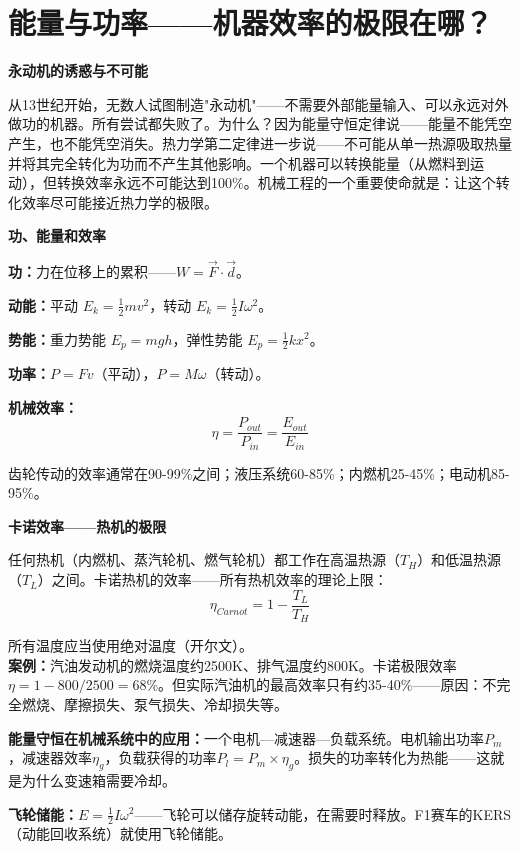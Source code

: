 \documentclass[a4paper,11pt]{ctexbook}
\newenvironment{scenario}{
  \vspace{0.4cm}
  \noindent\begin{tcolorbox}[colback=scenario!5!white,colframe=scenario!70!black,title=\textcolor{scenario}{\textbf{情景引入}}]
  \vspace{0.1cm}
}{\end{tcolorbox}\vspace{0.3cm}}
\newenvironment{qualitative}{
  \vspace{0.3cm}
  \noindent\begin{tcolorbox}[colback=themeblue!5!white,colframe=themeblue!60!black,title=\textcolor{themeblue}{\textbf{定性分析}}]
  \vspace{0.1cm}
}{\end{tcolorbox}\vspace{0.3cm}}
\newenvironment{quantitative}{
  \vspace{0.3cm}
  \noindent\begin{tcolorbox}[colback=quant!5!white,colframe=quant!60!black,title=\textcolor{quant}{\textbf{定量分析}}]
  \vspace{0.1cm}
}{\end{tcolorbox}\vspace{0.3cm}}
\begin{document}
\newpage
\chapter{能量与功率——机器效率的极限在哪？}

\begin{scenario}
\textbf{永动机的诱惑与不可能}

从13世纪开始，无数人试图制造"永动机"——不需要外部能量输入、可以永远对外做功的机器。所有尝试都失败了。为什么？因为能量守恒定律说——能量不能凭空产生，也不能凭空消失。热力学第二定律进一步说——不可能从单一热源吸取热量并将其完全转化为功而不产生其他影响。一个机器可以转换能量（从燃料到运动），但转换效率永远不可能达到100\%。机械工程的一个重要使命就是：让这个转化效率尽可能接近热力学的极限。
\end{scenario}

\begin{qualitative}
\textbf{功、能量和效率}

\textbf{功：}力在位移上的累积——$W = \vec{F} \cdot \vec{d}$。

\textbf{动能：}平动 $E_k = \frac12 mv^2$，转动 $E_k = \frac12 I\omega^2$。

\textbf{势能：}重力势能 $E_p = mgh$，弹性势能 $E_p = \frac12 kx^2$。

\textbf{功率：}$P = Fv$（平动），$P = M\omega$（转动）。

\textbf{机械效率：}
\[
\eta = \frac{P_{out}}{P_{in}} = \frac{E_{out}}{E_{in}}
\]

齿轮传动的效率通常在90-99\%之间；液压系统60-85\%；内燃机25-45\%；电动机85-95\%。
\end{qualitative}

\begin{quantitative}
\textbf{卡诺效率——热机的极限}

任何热机（内燃机、蒸汽轮机、燃气轮机）都工作在高温热源（$T_H$）和低温热源（$T_L$）之间。卡诺热机的效率——所有热机效率的理论上限：
\[
\eta_{Carnot} = 1 - \frac{T_L}{T_H}
\]

所有温度应当使用绝对温度（开尔文）。\\
\textbf{案例：}汽油发动机的燃烧温度约2500K、排气温度约800K。卡诺极限效率 $\eta = 1 - 800/2500 = 68\%$。但实际汽油机的最高效率只有约35-40\%——原因：不完全燃烧、摩擦损失、泵气损失、冷却损失等。

\textbf{能量守恒在机械系统中的应用：}一个电机—减速器—负载系统。电机输出功率$P_m$，减速器效率$\eta_g$，负载获得的功率$P_l = P_m \times \eta_g$。损失的功率转化为热能——这就是为什么变速箱需要冷却。

\textbf{飞轮储能：}$E = \frac12 I\omega^2$——飞轮可以储存旋转动能，在需要时释放。F1赛车的KERS（动能回收系统）就使用飞轮储能。
\end{quantitative}
\end{document}
